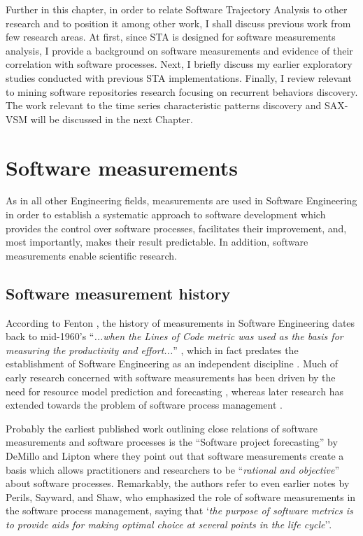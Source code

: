 Further in this chapter, in order to relate Software Trajectory Analysis to other research and to position 
it among other work, I shall discuss previous work from few research areas.
At first, since STA is designed for software measurements analysis, I provide a background on software 
measurements and evidence of their correlation with software processes. 
Next, I briefly discuss my earlier exploratory studies conducted with previous STA implementations. 
Finally, I review relevant to mining software repositories research focusing on recurrent behaviors discovery.
The work relevant to the time series characteristic patterns discovery and SAX-VSM will be discussed 
in the next Chapter.

\section{Software measurements}
As in all other Engineering fields, measurements are used in Software Engineering in order to establish a 
systematic approach to software development which provides the control over software processes, facilitates
their improvement, and, most importantly, makes their result predictable. 
In addition, software measurements enable scientific research.

\subsection{Software measurement history}
According to Fenton \cite{citeulike:1525462}, the history of measurements in Software Engineering dates 
back to mid-1960's  ``\textit{...when the Lines of Code metric was used as the basis for measuring the 
productivity and effort...}'' , which in fact predates the establishment of Software Engineering as an 
independent discipline \cite{naur_crisis_68}. 
Much of early research concerned with software measurements has been driven by the need for resource model 
prediction and forecasting \cite{citeulike:1525462}, whereas later research has extended towards the problem 
of software process management \cite{citeulike:13158802}.

Probably the earliest published work outlining close relations of software measurements and software 
processes is the ``Software project forecasting'' by DeMillo and Lipton \cite{demillo1980software} where they 
point out that software measurements create a basis which allows practitioners and researchers to be 
``\textit{rational and objective}'' about software processes. 
Remarkably, the authors refer to even earlier notes by Perils, Sayward, and Shaw, who emphasized the role of software 
measurements in the software process management, saying that `\textit{the purpose of software metrics is 
to provide aids for making optimal choice at several points in the life cycle}''.


